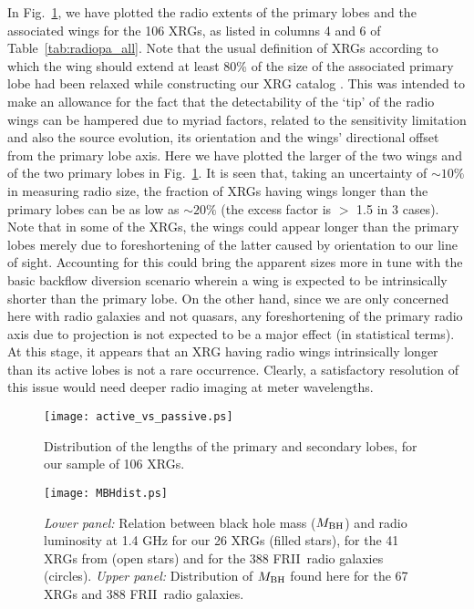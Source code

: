 \documentclass[twocolumn]{aastex62}
\def\frii{FR{II}~}
\begin{document}
In Fig.~\ref{fig:l_dist}, we have plotted the radio extents of the
primary lobes and the associated wings for the 106 XRGs, as listed in
columns 4 and 6 of Table~\ref{tab:radiopa_all}. Note that the usual
definition of XRGs according to which the wing should extend at least
80\% of the size of the associated primary lobe had been relaxed while
constructing our XRG catalog \citep[see section
  2,][]{Yang2019arXiv190506356Y}. This was intended to make an
allowance for the fact that the detectability of the `tip' of the
radio wings can be hampered due to myriad factors, related to the
sensitivity limitation and also the source evolution, its orientation
and the wings' directional offset from the primary lobe axis. Here we
have plotted the larger of the two wings and of the two primary lobes
in Fig.~\ref{fig:l_dist}. It is seen that, taking an uncertainty of
$\sim 10\%$ in measuring radio size, the fraction of XRGs having wings
longer than the primary lobes can be as low as $\sim 20\%$ (the excess
factor is $>$ 1.5 in 3 cases). Note that in some of the XRGs, the
wings could appear longer than the primary lobes merely due to
 foreshortening of the latter caused by orientation to our line of sight. Accounting for this could
bring the apparent sizes more in tune with the basic backflow
diversion scenario wherein a wing is expected to be intrinsically
shorter than  the primary lobe. On the other hand, since we are
only concerned here with radio galaxies  and not quasars, any foreshortening of the
primary radio axis due to projection is not expected to be a major
effect (in statistical terms). At this stage, it appears that an XRG having
radio wings intrinsically longer than its active lobes is not a rare
occurrence. Clearly, a satisfactory resolution of this issue would
need deeper radio imaging at meter wavelengths.

\begin{figure}
  \centering
\texttt{[image: active\_vs\_passive.ps]}
  \caption{Distribution of the lengths of the primary and secondary lobes,
   for our sample of 106 XRGs. }
\label{fig:l_dist}
 \end{figure}


 \begin{figure}
  \centering
\texttt{[image: MBHdist.ps]}
  \caption{\emph{Lower panel:} Relation between black hole mass
  ($M_{\rm BH}$) and radio luminosity at 1.4 GHz for our 26 XRGs
  (filled stars), for the 41 XRGs from   \citet{Mezcua2011A&A...527A..38M,Mezcua2012A&A...544A..36M}
  (open stars) and for the 388 \frii radio galaxies (circles).
  \emph{Upper panel:} Distribution of $M_{\rm BH}$ found here for the 67 XRGs
  and 388 \frii radio galaxies.}  
\label{fig:mbh_dist}
 \end{figure}
\end{document}
